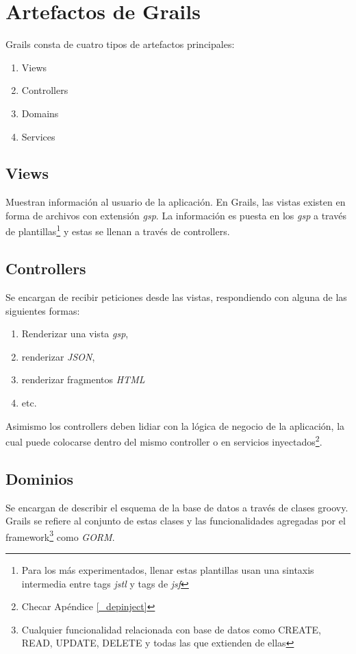 \newpage
\section{Artefactos de Grails}
Grails consta de cuatro tipos de artefactos principales:
\begin{enumerate}
 \item Views
 \item Controllers
 \item Domains
 \item Services
\end{enumerate}

\subsection{Views}
Muestran informaci\'on al usuario de la aplicaci\'on. En Grails, las vistas existen en forma de archivos con extensi\'on \textit{gsp}. La informaci\'on es puesta en los \textit{gsp} a trav\'es de plantillas\footnote{Para los m\'as experimentados, llenar estas plantillas usan una sintaxis intermedia entre tags \textit{jstl} y tags de \textit{jsf}} y estas se llenan a trav\'es de controllers. 

\subsection{Controllers}
Se encargan de recibir peticiones desde las vistas, respondiendo con alguna de las siguientes formas:
\begin{enumerate}
 \item Renderizar una vista \textit{gsp},
 \item renderizar \textit{JSON},
 \item renderizar fragmentos \textit{HTML}
 \item etc.
\end{enumerate}

Asimismo los controllers deben lidiar con la l\'ogica de negocio de la aplicaci\'on, la cual puede colocarse dentro del mismo controller o en servicios inyectados\footnote{Checar Ap\'endice \ref{_depinject}}.

\subsection{Dominios}
Se encargan de describir el esquema de la base de datos a trav\'es de clases groovy. Grails se refiere al conjunto de estas clases y las funcionalidades agregadas por el framework\footnote{Cualquier funcionalidad relacionada con base de datos como CREATE, READ, UPDATE, DELETE y todas las que extienden de ellas} como \textit{GORM}.

